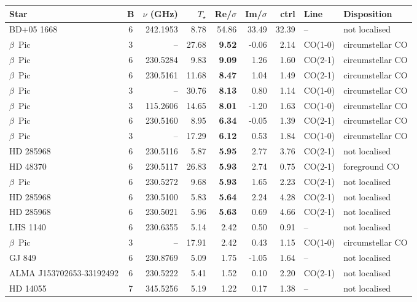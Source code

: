 \begin{tabular}{@{}l@{~}c@{~}r@{~}r@{~}r@{~}r@{~}r@{~}l@{~}l@{}}
\hline
Star & B & $\nu$ (GHz) & $T_\star$ & Re/$\sigma$ & Im/$\sigma$ & ctrl & Line & Disposition \\
\hline
BD+05 1668 & 6 & 242.1953 & 8.78 & 54.86 & 33.49 & 32.39 & -- & not localised \\
$\beta$~Pic & 3 & -- & 27.68 & \textbf{9.52} & -0.06 & 2.14 & CO(1-0) & circumstellar CO \\
$\beta$~Pic & 6 & 230.5284 & 9.83 & \textbf{9.09} & 1.26 & 1.60 & CO(2-1) & circumstellar CO \\
$\beta$~Pic & 6 & 230.5161 & 11.68 & \textbf{8.47} & 1.04 & 1.49 & CO(2-1) & circumstellar CO \\
$\beta$~Pic & 3 & -- & 30.76 & \textbf{8.13} & 0.80 & 1.14 & CO(1-0) & circumstellar CO \\
$\beta$~Pic & 3 & 115.2606 & 14.65 & \textbf{8.01} & -1.20 & 1.63 & CO(1-0) & circumstellar CO \\
$\beta$~Pic & 6 & 230.5160 & 8.95 & \textbf{6.34} & -0.05 & 1.39 & CO(2-1) & circumstellar CO \\
$\beta$~Pic & 3 & -- & 17.29 & \textbf{6.12} & 0.53 & 1.84 & CO(1-0) & circumstellar CO \\
HD 285968 & 6 & 230.5116 & 5.87 & \textbf{5.95} & 2.77 & 3.76 & CO(2-1) & not localised \\
HD 48370 & 6 & 230.5117 & 26.83 & \textbf{5.93} & 2.74 & 0.75 & CO(2-1) & foreground CO \\
$\beta$~Pic & 6 & 230.5272 & 9.68 & \textbf{5.93} & 1.65 & 2.23 & CO(2-1) & not localised \\
HD 285968 & 6 & 230.5100 & 5.83 & \textbf{5.64} & 2.24 & 4.28 & CO(2-1) & not localised \\
HD 285968 & 6 & 230.5021 & 5.96 & \textbf{5.63} & 0.69 & 4.66 & CO(2-1) & not localised \\
LHS 1140 & 6 & 230.6355 & 5.14 & 2.42 & 0.50 & 0.91 & -- & not localised \\
$\beta$~Pic & 3 & -- & 17.91 & 2.42 & 0.43 & 1.15 & CO(1-0) & circumstellar CO \\
GJ 849 & 6 & 230.8769 & 5.09 & 1.75 & -1.05 & 1.64 & -- & not localised \\
ALMA J153702653-33192492 & 6 & 230.5222 & 5.41 & 1.52 & 0.10 & 2.20 & CO(2-1) & not localised \\
HD 14055 & 7 & 345.5256 & 5.19 & 1.22 & 0.17 & 1.38 & -- & not localised \\

\end{tabular}

